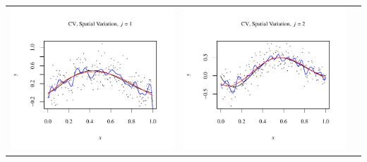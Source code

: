 \documentclass[11pt]{article}
\begin{document}
\begin{table}[h!]
  \begin{center}
    \renewcommand{\arraystretch}{1.5}
    \begin{tabular}{| >{\centering\arraybackslash}m{2.1in} |  >{\centering\arraybackslash}m{2.1in} |  >{\centering\arraybackslash}m{2.1in}|}
      \hline
      \includegraphics[width=1\linewidth,height=0.18\textheight]{Graphs/1/3/assignment5_a_1_3_1}&
      \includegraphics[width=1\linewidth,height=0.18\textheight]{Graphs/1/3/assignment5_a_1_3_2}&

\end{tabular}
\end{center}
\end{table}
\end{document}
